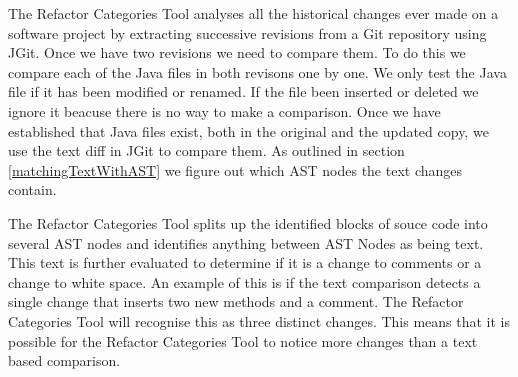 % 

The Refactor Categories Tool analyses all the historical changes ever made on a software project by extracting successive revisions from a Git repository using JGit.  Once we have two revisions we need to compare them.  To do this we compare each of the Java files in both revisons one by one. We only test the Java file if it has been modified or renamed.  If the file been inserted or deleted we ignore it beacuse there is no way to make a comparison. Once we have established that Java files exist, both in the original and the updated copy, we use the text diff in JGit to compare them. As outlined in section \ref{matchingTextWithAST} we figure out which AST nodes the text changes contain. 

The Refactor Categories Tool splits up the identified blocks of souce code into several AST nodes and identifies anything between AST Nodes as being text. 
This text is further evaluated to determine if it is a change to comments or a change to white space. 
An example of this is if the text comparison detects a single change that inserts two new methods and a comment.  
The Refactor Categories Tool will recognise this as three distinct changes. 
This means that it is possible for the Refactor Categories Tool to notice more changes than a text based comparison. 

